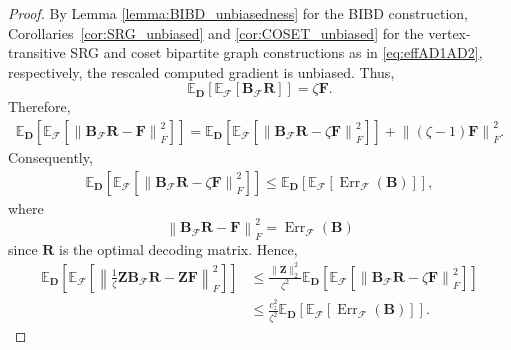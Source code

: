 \documentclass[journal,draftcls,onecolumn]{IEEEtran}
\theoremstyle{mystyle}
\newcommand{\aditya}[1]{\marginpar{+}{\bf Aditya's remark}: {\em #1}}
\newcommand{\sifat}[1]{\marginpar{+}{\bf Sifat's remark}: {\em #1}}
\begin{document}
\begin{proof}
By Lemma \ref{lemma:BIBD_unbiasedness} for the BIBD construction, Corollaries~\ref{cor:SRG_unbiased} and \ref{cor:COSET_unbiased} for the
vertex-transitive SRG and coset bipartite graph constructions as in
\eqref{eq:effAD1AD2}, respectively, the rescaled computed gradient is unbiased. Thus,
\begin{equation}
\mathbb E_{\mathbf D}
\left[
\mathbb E_{\mathcal F}
\left[
\mathbf B_{\mathcal F}\mathbf R
\right]
\right]
=
\zeta\mathbf F.
\end{equation}
Therefore,
\begin{align}
\mathbb E_{\mathbf D}
\left[
\mathbb E_{\mathcal F}
\left[
\left\|
\mathbf B_{\mathcal F}\mathbf R-\mathbf F
\right\|_F^2
\right]
\right] =
\mathbb E_{\mathbf D}
\left[
\mathbb E_{\mathcal F}
\left[
\left\|
\mathbf B_{\mathcal F}\mathbf R-\zeta\mathbf F
\right\|_F^2
\right]
\right]
+
\left\|
(\zeta-1)\mathbf F
\right\|_F^2.
\end{align}
Consequently,
\begin{align}
\mathbb E_{\mathbf D}
\left[
\mathbb E_{\mathcal F}
\left[
\left\|
\mathbf B_{\mathcal F}\mathbf R-\zeta\mathbf F
\right\|_F^2
\right]
\right]
\leq
\mathbb E_{\mathbf D}
\left[
\mathbb E_{\mathcal F}
\left[
\operatorname{Err}_{\mathcal F}(\mathbf B)
\right]
\right],
\end{align}
where
\begin{equation}
\left\|
\mathbf B_{\mathcal F}\mathbf R-\mathbf F
\right\|_F^2
=
\operatorname{Err}_{\mathcal F}(\mathbf B)
\end{equation}
since $\mathbf R$ is the optimal decoding matrix. Hence,
\begin{align}
\mathbb E_{\mathbf D}
\left[
\mathbb E_{\mathcal F}
\left[
\left\|
\frac{1}{\zeta}
\mathbf Z\mathbf B_{\mathcal F}\mathbf R
-
\mathbf Z\mathbf F
\right\|_F^2
\right]
\right]
&\leq
\frac{\|\mathbf Z\|_2^2}{\zeta^2}
\mathbb E_{\mathbf D}
\left[
\mathbb E_{\mathcal F}
\left[
\left\|
\mathbf B_{\mathcal F}\mathbf R-\zeta\mathbf F
\right\|_F^2
\right]
\right]
\\
&\leq
\frac{c_z^2}{\zeta^2}
\mathbb E_{\mathbf D}
\left[
\mathbb E_{\mathcal F}
\left[
\operatorname{Err}_{\mathcal F}(\mathbf B)
\right]
\right].
\end{align}


\end{proof}
\end{document}
